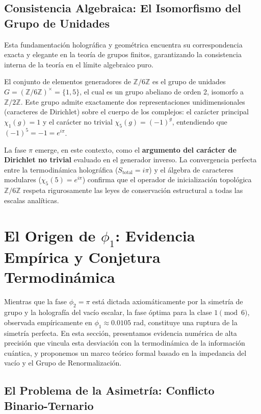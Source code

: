 \documentclass[12pt,a4paper]{article}
\theoremstyle{plain}
\theoremstyle{definition}
\theoremstyle{remark}
\begin{document}
\subsection{Consistencia Algebraica: El Isomorfismo del Grupo de Unidades}
\label{subsec:isomorfismo_unidades}

Esta fundamentación holográfica y geométrica encuentra su correspondencia exacta y elegante en la teoría de grupos finitos, garantizando la consistencia interna de la teoría en el límite algebraico puro.

El conjunto de elementos generadores de $\mathbb{Z}/6\mathbb{Z}$ es el grupo de unidades $G = (\mathbb{Z}/6\mathbb{Z})^{\times} = \{1,5\}$, el cual es un grupo abeliano de orden 2, isomorfo a $\mathbb{Z}/2\mathbb{Z}$. Este grupo admite exactamente dos representaciones unidimensionales (caracteres de Dirichlet) sobre el cuerpo de los complejos: el carácter principal $\chi_1(g) = 1$ y el carácter no trivial $\chi_5(g) = (-1)^g$, entendiendo que $(-1)^5 = -1 = e^{i\pi}$.

La fase $\pi$ emerge, en este contexto, como el \textbf{argumento del carácter de Dirichlet no trivial} evaluado en el generador inverso. La convergencia perfecta entre la termodinámica holográfica ($S_{\text{total}} = i\pi$) y el álgebra de caracteres modulares ($\chi_5(5) = e^{i\pi}$) confirma que el operador de inicialización topológica $\mathbb{Z}/6\mathbb{Z}$ respeta rigurosamente las leyes de conservación estructural a todas las escalas analíticas.

\section{El Origen de $\phi_1$: Evidencia Empírica y Conjetura Termodinámica}
\label{sec:origen_phi1}

Mientras que la fase $\phi_2 = \pi$ está dictada axiomáticamente por la simetría de grupo y la holografía del vacío escalar, la fase óptima para la clase $1 \pmod 6$, observada empíricamente en $\phi_1 \approx 0.0105$ rad, constituye una ruptura de la simetría perfecta. En esta sección, presentamos evidencia numérica de alta precisión que vincula esta desviación con la termodinámica de la información cuántica, y proponemos un marco teórico formal basado en la impedancia del vacío y el Grupo de Renormalización.

\subsection{El Problema de la Asimetría: Conflicto Binario-Ternario}
\end{document}
